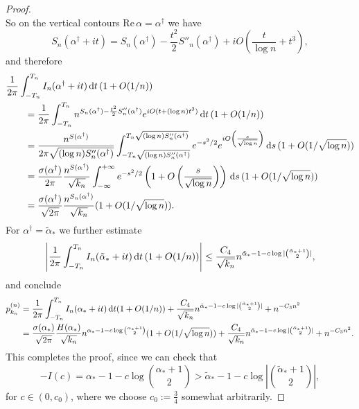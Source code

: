 \documentclass[11pt,a4paper]{article}
\numberwithin{equation}{section}
\newcommand{\dint}{\textup{d}}
\begin{document}
\begin{proof}
\begin{equation*}
    \end{equation*}
    So on the vertical contours $\mathrm{Re}\,\alpha=\alpha^\dag$ we have
    \begin{equation*}
        S_n(\alpha^\dag+it) = S_n(\alpha^\dag) - \frac{t^2}{2} S''_n(\alpha^\dag) + iO\left(\frac{t}{\log n}+t^3\right),
    \end{equation*}
    and therefore
    \begin{align*}
            &\frac{1}{2\pi} \int_{-T_n}^{T_n} I_n(\alpha^\dag+it) \, \dint t\, (1+O(1/n))\\
            &\qquad=\frac{1}{2\pi} \int_{-T_n}^{T_n} n^{S_n(\alpha^\dag)-\frac{t^2}{2} S''_n(\alpha^\dag)} e^{i O(t+(\log n)t^3)} \, \dint t\, (1+O(1/n))\\
            &\qquad= \frac{n^{S(\alpha^\dag)}}{2\pi \sqrt{(\log n)S''_n(\alpha^\dag)}} \int_{-T_n\sqrt{(\log n)S''_n(\alpha^\dag)}}^{T_n\sqrt{(\log n)S''_n(\alpha^\dag)}} e^{-s^2/2} e^{i O\left(\frac{s}{\sqrt{\log n}}\right)} \,\dint s\, (1+O(1/\sqrt{\log n}))\\
            &\qquad= \frac{\sigma(\alpha^\dag)}{2\pi} \frac{n^{S(\alpha^\dag)}}{\sqrt{k_n}} \int_{-\infty}^{+\infty} e^{-s^2/2} \left(1+O\left(\frac{s}{\sqrt{\log n}}\right)\right)\,\dint s\, (1+O(1/\sqrt{\log n}))\\
            &\qquad= \frac{\sigma(\alpha^\dag)}{\sqrt{2\pi}} \frac{n^{ S_n(\alpha^\dag)}}{\sqrt{k_n}} (1+O(1/\sqrt{\log n})).
    \end{align*}
    For $\alpha^\dag=\tilde{\alpha}_*$ we further estimate
    \begin{equation*}
        \left|\frac{1}{2\pi} \int_{-T_n}^{T_n} I_n(\tilde{\alpha}_*+it) \, \dint t\, (1+O(1/n)) \right|
        \leq \frac{C_4}{\sqrt{k_n}} n^{\tilde{\alpha}_*-1-c \log|\binom{\tilde{\alpha}_*+1}{2}|},
    \end{equation*}
    and conclude
    \begin{align*}
        p_{k_n}^{(n)} 
        &= \frac{1}{2\pi} \int_{-T_n}^{T_n} I_n(\alpha_*+it) \, \dint t (1+O(1/n)) 
            +  \frac{C_4}{\sqrt{k_n}} n^{\tilde{\alpha}_*-1-c \log|\binom{\tilde{\alpha}_*+1}{2}|} + n^{-C_3n^2}\\
        &=\frac{\sigma(\alpha_*)}{\sqrt{2\pi}} \frac{H(\alpha_*)}{\sqrt{k_n}}n^{\alpha_*-1-c\log\binom{\alpha_*+1}{2}} (1+O(1/\sqrt{\log n}))
            +  \frac{C_4}{\sqrt{k_n}} n^{\tilde{\alpha}_*-1-c \log|\binom{\tilde{\alpha}_*+1}{2}|} + n^{-C_3n^2}.
    \end{align*}
    This completes the proof, since we can check that 
    \begin{equation*}
        -I(c) = \alpha_*-1-c\log\binom{\alpha_*+1}{2} > \tilde{\alpha}_*-1-c \log\left|\binom{\tilde{\alpha}_*+1}{2}\right|,
    \end{equation*}
    for $c\in (0,c_0)$, where we choose $c_0:=\frac{3}{4}$ somewhat arbitrarily.
\end{proof}
\end{document}
